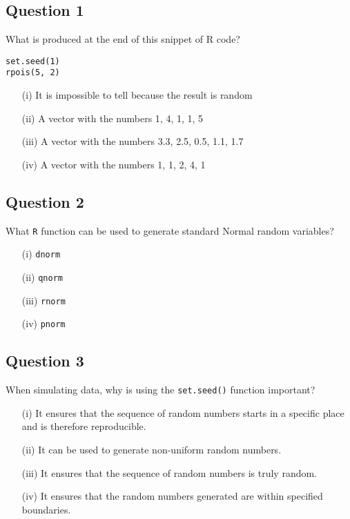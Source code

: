 \documentclass[11pt]{article} %
\begin{document}
\subsection*{Question 1}
What is produced at the end of this snippet of R code?
\begin{verbatim}
set.seed(1)
rpois(5, 2)
\end{verbatim}
\begin{itemize}
\item[(i)] It is impossible to tell because the result is random
\item[(ii)] A vector with the numbers 1, 4, 1, 1, 5
\item[(iii)] A vector with the numbers 3.3, 2.5, 0.5, 1.1, 1.7
\item[(iv)] A vector with the numbers 1, 1, 2, 4, 1
\end{itemize}
\newpage
\subsection*{Question 2}
What \texttt{R} function can be used to generate standard Normal random variables?

\begin{itemize}
\item[(i)] \texttt{dnorm}
\item[(ii)] \texttt{qnorm}
\item[(iii)] \texttt{rnorm}
\item[(iv)] \texttt{pnorm}
\end{itemize}
\newpage
\subsection*{Question 3}
When simulating data, why is using the \texttt{set.seed()} function important?
\begin{itemize}
\item[(i)] It ensures that the sequence of random numbers starts in a specific place and is therefore reproducible.
\item[(ii)] It can be used to generate non-uniform random numbers.
\item[(iii)] It ensures that the sequence of random numbers is truly random.
\item[(iv)] It ensures that the random numbers generated are within specified boundaries.
\end{itemize}
\newpage
\end{document}
